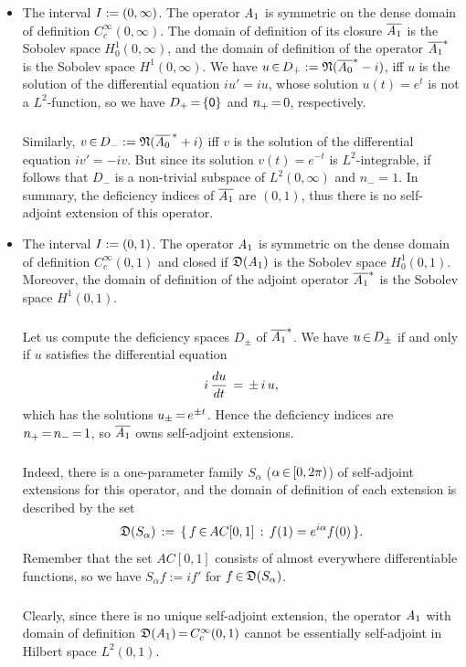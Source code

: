 \documentclass[11pt,twoside]{article}
\begin{document}
\begin{itemize}[leftmargin=5mm]
\item[1.]
The interval $\J := (0,\infty)$.
The operator $\linA_1$ is symmetric
on the dense domain of definition $C_c^{\infty}(0,\infty)$.
The domain of definition of its closure $\overline{\linA_1}$ is
the Sobolev space $H_0^1(0,\infty)$,
and the domain of definition of the operator $\overline{\linA_1}^*$
is the Sobolev space $H^1(0,\infty)$.
We have $u \xeof D_+ := \kernel{\overline{\linA_0}^*-i}$, iff
$u$ is the solution of the differential equation $iu'=iu$,
whose solution $u(t)=e^{t}$ is not a $L^2$-function,
so we have $D_+ \eq \{\0\}$ and $n_+ \eq 0$, respectively.

\subparagraph*{}
Similarly,
$v \xeof D_- := \kernel{\overline{\linA_0}^{\,*} +i}$ iff
$v$ is the solution of the differential equation $iv'=-iv$.
But since its solution $v(t)=e^{-t}$ is $L^2$-integrable,
if follows that
$D_-$ is a non-trivial subspace of $L^2(0,\infty)$ and $n_-=1$.
In summary,
the deficiency indices of $\overline{\linA_1}$ are $(0,1)$,
thus there is no self-adjoint extension of this operator.

\item[2.]
The interval $\J := (0,1)$.
The operator $\linA_1$ is symmetric on the dense domain of definition
$C_c^{\infty}(0,1)$ and closed if $\domain{\linA_1}$
is the Sobolev space $H_0^1(0,1)$.
Moreover,
the domain of definition of the adjoint operator $\overline{\linA_1}^*$
is the Sobolev space $H^1(0,1)$.

\subparagraph*{}
Let us compute the deficiency spaces $D_{\pm}$ of $\overline{\linA_1}^*$.
We have $u \xeof D_{\pm}$
if and only if
$u$ satisfies the differential equation
\[
i \, \frac{du}{dt} \= \pm \, i \, u,
\]
which has the solutions $u_{\pm} \eq e^{\pm t}$.
Hence the deficiency indices are $n_+ \eq n_- \eq 1$,
so $\overline{\linA_1}$ owns self-adjoint extensions.

\subparagraph*{}
Indeed,
there is a one-parameter family $S_{\alpha}$ ($\alpha \xeof [0,2\pi)$)
of self-adjoint extensions for this operator, 
and the domain of definition of each extension is described by the set
\[
\domain{S_{\alpha}} \eqdef \set{f \xeof AC[0,1]}{f(1)=e^{i \alpha} f(0)}.
\]
Remember
that the set $AC[0,1]$ consists of almost everywhere differentiable functions, 
so we have $S_{\alpha}f := i f'$ for $f \xeof \domain{S_{\alpha}}$.

\subparagraph*{}
Clearly,
since there is no unique self-adjoint extension,
the operator $\linA_1$ with domain of definition
$\domain{\linA_1} \eq C_c^{\infty}(0,1)$
cannot be essentially self-adjoint in Hilbert space $L^2(0,1)$.
\end{itemize}
\end{document}
